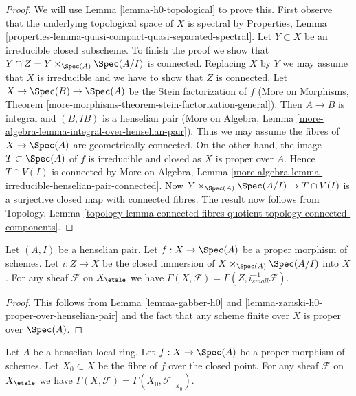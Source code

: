 \begin{proof}
We will use Lemma \ref{lemma-h0-topological} to prove this. First observe
that the underlying topological space of $X$ is spectral by Properties, Lemma
\ref{properties-lemma-quasi-compact-quasi-separated-spectral}.
Let $Y \subset X$ be an irreducible closed subscheme. To finish the proof
we show that $Y \cap Z = Y \times_{\Spec(A)} \Spec(A/I)$ is connected.
Replacing $X$ by $Y$
we may assume that $X$ is irreducible and we have to show that $Z$
is connected. Let $X \to \Spec(B) \to \Spec(A)$ be the Stein factorization
of $f$ (More on Morphisms, Theorem
\ref{more-morphisms-theorem-stein-factorization-general}).
Then $A \to B$ is integral and $(B, IB)$ is a henselian pair
(More on Algebra, Lemma \ref{more-algebra-lemma-integral-over-henselian-pair}).
Thus we may assume the fibres of $X \to \Spec(A)$ are geometrically
connected. On the other hand, the image $T \subset \Spec(A)$ of $f$
is irreducible and closed as $X$ is proper over $A$. Hence $T \cap V(I)$
is connected by More on Algebra, Lemma
\ref{more-algebra-lemma-irreducible-henselian-pair-connected}.
Now $Y \times_{\Spec(A)} \Spec(A/I) \to T \cap V(I)$
is a surjective closed map with connected fibres.
The result now follows from Topology, Lemma
\ref{topology-lemma-connected-fibres-quotient-topology-connected-components}.
\end{proof}

\begin{lemma}
\label{lemma-h0-proper-over-henselian-pair}
Let $(A, I)$ be a henselian pair. Let $f : X \to \Spec(A)$ be a proper morphism
of schemes. Let $i : Z \to X$ be the closed immersion of
$X \times_{\Spec(A)} \Spec(A/I)$ into $X$. For any
sheaf $\mathcal{F}$ on $X_\etale$ we
have $\Gamma(X, \mathcal{F}) = \Gamma(Z, i_{small}^{-1}\mathcal{F})$.
\end{lemma}

\begin{proof}
This follows from Lemma \ref{lemma-gabber-h0} and
\ref{lemma-zariski-h0-proper-over-henselian-pair}
and the fact that any scheme finite over $X$ is proper over $\Spec(A)$.
\end{proof}

\begin{lemma}
\label{lemma-h0-proper-over-henselian-local}
Let $A$ be a henselian local ring. Let $f : X \to \Spec(A)$
be a proper morphism of schemes. Let $X_0 \subset X$ be the fibre of
$f$ over the closed point. For any sheaf $\mathcal{F}$ on $X_\etale$ we
have $\Gamma(X, \mathcal{F}) = \Gamma(X_0, \mathcal{F}|_{X_0})$.
\end{lemma}

